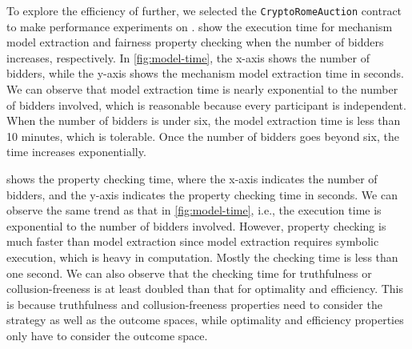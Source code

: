 To explore the efficiency of \faircon further, we selected the \texttt{CryptoRomeAuction} contract to
make performance experiments on \faircon.
 show the execution time for mechanism model extraction and
fairness property checking when the number of bidders increases, respectively.
In \cref{fig:model-time}, the x-axis shows the number of bidders, while the y-axis shows the
mechanism model extraction time in seconds. We can observe that model extraction time is nearly
exponential to the number of bidders involved, which is reasonable because every participant is
independent.
When the number of bidders is under six, the model extraction time is less than 10 minutes, which
is tolerable. Once the number of bidders goes beyond six, the time increases exponentially.

 shows the property checking time, where the x-axis indicates the number of
bidders, and the y-axis indicates the property checking time in seconds. We can observe the same
trend as that in \cref{fig:model-time}, i.e., the execution time is exponential to the number
of bidders involved. However, property checking is much faster than model extraction since model
extraction requires symbolic execution, which is heavy in computation. Mostly the checking time is
less than one second. We can also observe that the checking time for truthfulness or
collusion-freeness is at least doubled than that for optimality and efficiency. This is because
truthfulness and collusion-freeness properties need to consider the strategy as well as the outcome
spaces, while optimality and efficiency properties only have to consider the outcome space.


